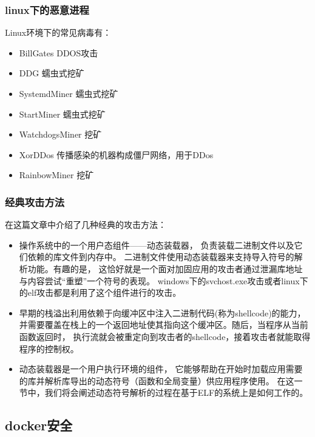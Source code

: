 \documentclass[AutoFakeBold,a4paper]{ctexart}
\begin{document}
\subsubsection{linux下的恶意进程}

Linux环境下的常见病毒有：\cite{LinuxVirus2020}

\begin{itemize}
    \item BillGates DDOS攻击
    \item DDG 蠕虫式挖矿
    \item SystemdMiner 蠕虫式挖矿
    \item StartMiner 蠕虫式挖矿
    \item WatchdogsMiner 挖矿
    \item XorDDos 传播感染的机器构成僵尸网络，用于DDos
    \item RainbowMiner 挖矿
\end{itemize}

\subsubsection{经典攻击方法}

在这篇文章\cite{di2015elf}中介绍了几种经典的攻击方法：

\begin{itemize}
    \item 操作系统中的一个用户态组件——动态装载器，
    负责装载二进制文件以及它们依赖的库文件到内存中。
    二进制文件使用动态装载器来支持导入符号的解析功能。有趣的是，
    这恰好就是一个面对加固应用的攻击者通过泄漏库地址与内容尝试“重塑”一个符号的表现。
    windows下的svchost.exe攻击或者linux下的elf攻击都是利用了这个组件进行的攻击。
    \item 早期的栈溢出利用依赖于向缓冲区中注入二进制代码(称为shellcode)的能力，
    并需要覆盖在栈上的一个返回地址使其指向这个缓冲区。随后，当程序从当前函数返回时，
    执行流就会被重定向到攻击者的shellcode，接着攻击者就能取得程序的控制权。
    \item 动态装载器是一个用户执行环境的组件，
    它能够帮助在开始时加载应用需要的库并解析库导出的动态符号（函数和全局变量）供应用程序使用。
    在这一节中，我们将会阐述动态符号解析的过程在基于ELF的系统上是如何工作的。
\end{itemize}

\subsection{docker安全}
\end{document}
